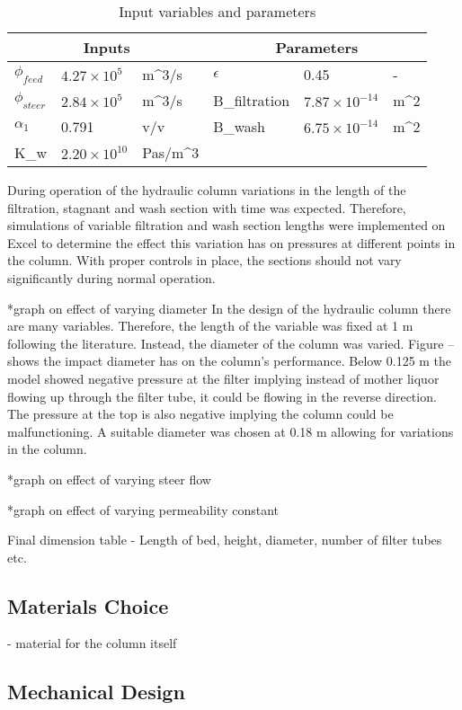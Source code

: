 \begin{table}[]
\caption{Input variables and parameters}
\label{tab:inputsparameters}
\begin{tabular}{llllll}
\hline
\multicolumn{3}{|c|}{Inputs}          & \multicolumn{3}{c|}{Parameters}             \\ \toprule
$\phi_{feed}$  & $4.27\times10^{5}$ & m^{3}/s &
$\epsilon$  & 0.45  & - \\ \hline
$\phi_{steer}$    & $2.84\times10^{5}$ & m^{3}/s &
B_{filtration}  & $7.87\times10^{-14}$ & m^{2} \\ \hline
$\alpha_1$ & 0.791  & v/v &
B_{wash}  & $6.75\times10^{-14}$ & m^{2} \\ \hline
K_{w} &  $2.20\times10^{10}$ & Pas/m^{3}  & &  &  \\ \bottomrule
\end{tabular}
\end{table}

During operation of the hydraulic column  variations in the length of the filtration, stagnant and wash section with time was expected. Therefore, simulations of variable filtration and wash section lengths were implemented on Excel to determine the effect this variation has on pressures at different points in the column. With proper controls in place, the sections should not vary significantly during normal operation. 

*graph on effect of varying diameter 
In the design of the hydraulic column there are many variables. Therefore, the length of the variable was fixed at 1 m following the literature. Instead, the diameter of the column was varied. Figure -- shows the impact diameter has on the column's performance. Below 0.125 m the model showed negative pressure at the filter implying instead of mother liquor flowing up through the filter tube, it could be flowing in the reverse direction. The pressure at the top is also negative implying the column could be malfunctioning. A suitable diameter was chosen at 0.18 m allowing for variations in the column. 

*graph on effect of varying steer flow 



*graph on effect of varying permeability constant

Final dimension table - Length of bed, height, diameter, number of filter tubes etc. 


\subsection{Materials Choice}
- material for the column itself 

\subsection{Mechanical Design}

